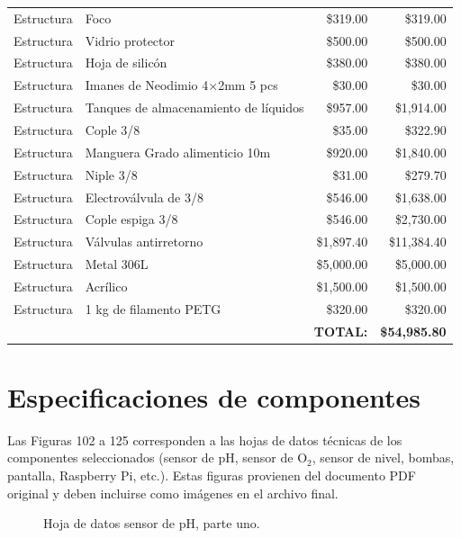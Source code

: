 \documentclass[11pt,tesis,twoside,openright,spanish]{upiiztt}
\begin{document}
\begin{table}[H]
\begin{tabular}{llrr}
Estructura  & Foco                                  & \$319.00   & \$319.00 \\
Estructura  & Vidrio protector                      & \$500.00   & \$500.00 \\
Estructura  & Hoja de silicón                       & \$380.00   & \$380.00 \\
Estructura  & Imanes de Neodimio 4$\times$2mm 5 pcs & \$30.00    & \$30.00 \\
Estructura  & Tanques de almacenamiento de líquidos & \$957.00   & \$1,914.00 \\
Estructura  & Cople 3/8                             & \$35.00    & \$322.90 \\
Estructura  & Manguera Grado alimenticio 10m        & \$920.00   & \$1,840.00 \\
Estructura  & Niple 3/8                             & \$31.00    & \$279.70 \\
Estructura  & Electroválvula de 3/8                 & \$546.00   & \$1,638.00 \\
Estructura  & Cople espiga 3/8                      & \$546.00   & \$2,730.00 \\
Estructura  & Válvulas antirretorno                 & \$1,897.40 & \$11,384.40 \\
Estructura  & Metal 306L                            & \$5,000.00 & \$5,000.00 \\
Estructura  & Acrílico                              & \$1,500.00 & \$1,500.00 \\
Estructura  & 1 kg de filamento PETG                & \$320.00   & \$320.00 \\
\midrule
\multicolumn{3}{r}{\textbf{TOTAL:}} & \textbf{\$54,985.80} \\
\bottomrule
\end{tabular}
\end{table}

\section*{Especificaciones de componentes}

\noindent Las Figuras 102 a 125 corresponden a las hojas de datos técnicas de los componentes
seleccionados (sensor de pH, sensor de O$_2$, sensor de nivel, bombas, pantalla,
Raspberry Pi, etc.). Estas figuras provienen del documento PDF original y deben
incluirse como imágenes en el archivo final.

\begin{figure}[H]
  \centering
  \caption{Hoja de datos sensor de pH, parte uno.}
  \label{fig:hoja_ph1}
\end{figure}
\end{document}
